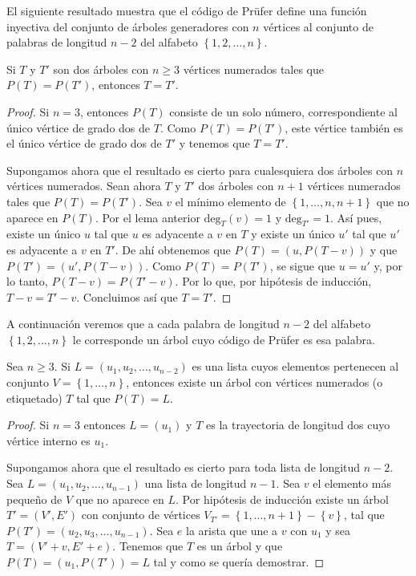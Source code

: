 El siguiente resultado muestra que el código de Prüfer define una función inyectiva del conjunto de árboles generadores con $n$ vértices al conjunto de palabras de longitud $n-2$ del alfabeto $\left\lbrace 1,2,\dots, n\right\rbrace$.

\begin{proposition}\label{prop:2}
Si $T$ y $T'$ son dos árboles con $n \geq 3$ vértices numerados tales que $P(T) = P(T')$, entonces $T = T'$.
\end{proposition}

\begin{proof}
Si $n = 3$, entonces $P(T)$ consiste de un solo número, correspondiente al único vértice de grado dos de $T$. Como $P(T) = P(T')$, este vértice también es el único vértice de grado dos de $T'$ y tenemos que $T = T'$.

Supongamos ahora que el resultado es cierto para cualesquiera dos árboles con $n$ vértices numerados. Sean ahora $T$ y $T'$ dos árboles con $n+1$ vértices numerados tales que $P(T) = P(T')$.  Sea $v$ el mínimo elemento de $\left \lbrace 1,\dots,n,n+1\right \rbrace$ que no aparece en $P(T)$. Por el lema anterior $\text{deg}_T (v) = 1$ y $\text{deg}_{T'} = 1$. Así pues, existe un único $u$ tal que $u$ es adyacente a $v$ en $T$ y existe un único $u'$ tal que $u'$ es adyacente a $v$ en $T'$. De ahí obtenemos que $P(T) = (u,P(T-v))$ y que $P(T') = (u',P(T-v))$. Como $P(T) = P(T')$, se sigue que $u = u'$ y, por lo tanto, $P(T-v) = P(T'-v)$. Por lo que, por hipótesis de inducción, $T-v = T'-v$. Concluimos así que $T=T'$.
\end{proof}

A continuación veremos que a cada palabra de longitud $n-2$ del alfabeto $\left\lbrace 1,2,\dots,n \right\rbrace$ le corresponde un árbol cuyo código de Prüfer es esa palabra.

\begin{proposition}\label{prop:3}
Sea $n \geq 3$. Si $L = (u_1,u_2,\dots,u_{n-2})$ es una lista cuyos elementos pertenecen al conjunto $V = \left\lbrace 1,\dots,n\right\rbrace$, entonces existe un árbol con vértices numerados (o etiquetado) $T$ tal que $P(T) = L$.
\end{proposition}

\begin{proof}
Si $n=3$ entonces $L = (u_1)$ y $T$ es la trayectoria de longitud dos cuyo vértice interno es $u_1$.

Supongamos ahora que el resultado es cierto para toda lista de longitud $n-2$. Sea $L = (u_1,u_2,\dots,u_{n-1})$ una lista de longitud $n-1$. Sea $v$ el elemento más pequeño de $V$ que no aparece en $L$. Por hipótesis de inducción existe un árbol $T' = (V',E')$ con conjunto de vértices $V_{T'} = \left\lbrace 1,\dots,n+1 \right\rbrace - \left\lbrace v \right\rbrace$, tal que $P(T') = (u_2,u_3,\dots,u_{n-1})$. Sea $e$ la arista que une a $v$ con $u_1$ y sea $T = (V' + v, E' + e)$. Tenemos que $T$ es un árbol y que $P(T) = (u_1,P(T')) = L$ tal y como se quería demostrar.
\end{proof}

